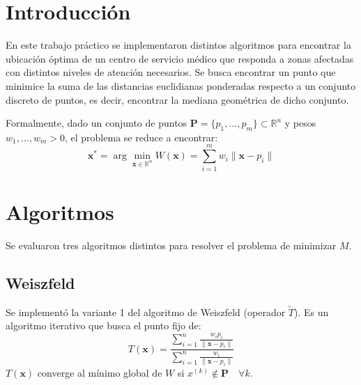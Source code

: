 \documentclass[10pt]{article}
\begin{document}

	\fecha{\today}



	\maketitle

\section{Introducción}

En este trabajo práctico se implementaron distintos algoritmos para encontrar la ubicación óptima de un centro de servicio médico que responda a zonas afectadas con distintos niveles de atención necesarios. Se busca encontrar un punto que minimice la suma de las distancias euclidianas ponderadas respecto a un conjunto discreto de puntos, es decir, encontrar la mediana geométrica de dicho conjunto.

Formalmente, dado un conjunto de puntos $ \mathbf{P} = \{p_1, \dots, p_m\} \subset \mathbb{R}^n$ y pesos $w_1, \dots, w_m > 0$, el problema se reduce a encontrar:
\[
\mathbf{x}^* = \arg \min_{\mathbf{x} \in \mathbb{R}^n} W(\mathbf{x}) = \sum_{i=1}^{m} w_i \|\mathbf{x} - p_i\|
\]

\section{Algoritmos}

Se evaluaron tres algoritmos distintos para resolver el problema de minimizar $M$.

\subsection{Weiszfeld}

Se implementó la variante 1  del algoritmo de Weiszfeld (operador $\tilde{T}$). Es un algoritmo iterativo que busca el punto fijo de:
\[
T(\mathbf{x}) = \frac{ \sum_{i=1}^{n} \frac{w_i p_i}{\| \mathbf{x} - p_i \|} }{ \sum_{i=1}^{n} \frac{w_i}{\| \mathbf{x} - p_i \|} }
\]
$T(\mathbf{x})$ converge al mínimo global de $W$ si $x^{(k)} \notin \mathbf{P} \quad \forall k$.
\end{document}
